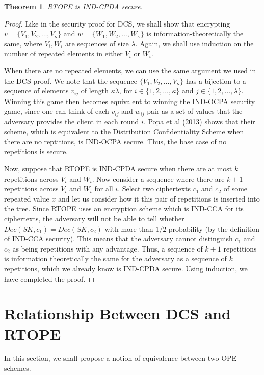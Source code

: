 \documentclass[12pt]{article}
\newtheorem{theorem}{Theorem}[section]
\begin{document}
  \begin{theorem}
    RTOPE is IND-CPDA secure.
  \end{theorem}
  \begin{proof}
    Like in the security proof for DCS, we shall show that encrypting $v = \{V_1, V_2, \ldots, V_{\kappa} \}$ and $w = \{W_1, W_2, \ldots, W_{\kappa}\}$ is information-theoretically the same, where $V_i, W_i$ are sequences of size $\lambda$. Again, we shall use induction on the number of repeated elements in either $V_i$ or $W_i$. 

    When there are no repeated elements, we can use the same argument we used in the DCS proof. We note that the sequence $\{V_1, V_2, \ldots, V_{\kappa} \}$ has a bijection to a sequence of elements $v_{ij}$ of length $\kappa \lambda$, for $i \in \{1, 2, \ldots, \kappa\}$ and $j \in \{1, 2, \ldots, \lambda \}$. Winning this game then becomes equivalent to winning the IND-OCPA security game, since one can think of each $v_{ij}$ and $w_{ij}$ pair as a set of values that the adversary provides the client in each round $i$. Popa et al (2013) shows that their scheme, which is equivalent to the Distribution Confidentiality Scheme when there are no reptitions, is IND-OCPA secure. Thus, the base case of no repetitions is secure.

    Now, suppose that RTOPE is IND-CPDA secure when there are at most $k$ repetitions across $V_i$ and $W_i$. Now consider a sequence where there are $k+1$ repetitions across $V_i$ and $W_i$ for all $i$. Select two ciphertexts $c_1$ and $c_2$ of some repeated value $x$ and let us consider how it this pair of repetitions is inserted into the tree. Since RTOPE uses an encryption scheme which is IND-CCA for its ciphertexts, the adversary will not be able to tell whether $Dec(SK, c_1) = Dec(SK, c_2)$ with more than $1/2$ probability (by the definition of IND-CCA security). This means that the adversary cannot distinguish $c_1$ and $c_2$ as being repetitions with any advantage. Thus, a sequence of $k+1$ repetitions is information theoretically the same for the adversary as a sequence of $k$ repetitions, which we already know is IND-CPDA secure. Using induction, we have completed the proof.  
  \end{proof}

\section{Relationship Between DCS and RTOPE}

  In this section, we shall propose a notion of equivalence between two OPE schemes.
\end{document}
